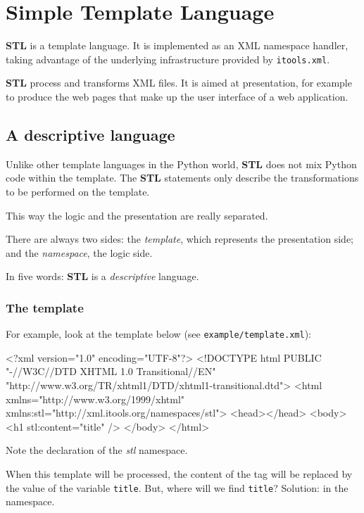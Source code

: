 \chapter{Simple Template Language}
\label{Chapter: STL}

{\bf STL} is a template language. It is implemented as an XML namespace
handler, taking advantage of the underlying infrastructure provided by
{\tt itools.xml}.

{\bf STL} process and transforms XML files. It is aimed at presentation,
for example to produce the web pages that make up the user interface of
a web application.


\section{A descriptive language}

Unlike other template languages in the Python world, {\bf STL} does not
mix Python code within the template. The {\bf STL} statements only describe
the transformations to be performed on the template.

This way the logic and the presentation are really separated.

There are always two sides: the {\em template}, which represents the
presentation side; and the {\em namespace}, the logic side.

In five words: {\bf STL} is a {\em descriptive} language.

\subsection{The template}

For example, look at the template below (see {\tt example/template.xml}):

\begin{code}
    <?xml version="1.0" encoding="UTF-8"?>
    <!DOCTYPE html
         PUBLIC "-//W3C//DTD XHTML 1.0 Transitional//EN"
         "http://www.w3.org/TR/xhtml1/DTD/xhtml1-transitional.dtd">
    <html xmlns="http://www.w3.org/1999/xhtml"
          xmlns:stl="http://xml.itools.org/namespaces/stl">
      <head></head>
      <body>
        <h1 stl:content="title" />
      </body>
    </html>
\end{code}

Note the declaration of the {\em stl} namespace.

When this template will be processed, the content of the {\tt <h1>} tag
will be replaced by the value of the variable {\tt title}. But, where will
we find {\tt title}? Solution: in the namespace.

